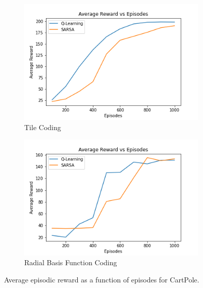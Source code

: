 \documentclass{article}
\begin{document}
        \begin{figure}[H]
            \graphicspath{ {../Experiments/Linear_Function_Approximation/} }
            \centering
            \begin{subfigure}{.5\textwidth}
              \centering
              \includegraphics[width=\linewidth]{Cartpole_tile.png}
              \caption{Tile Coding}
              \label{cartpole_tile}
            \end{subfigure}%
            \begin{subfigure}{.5\textwidth}
              \centering
              \includegraphics[width=\linewidth]{Cartpole_radial.png}
              \caption{Radial Basis Function Coding}
              \label{cartpole_radial}
            \end{subfigure}
            \caption{Average episodic reward as a function of episodes for CartPole.}
            \end{figure}
\end{document}
